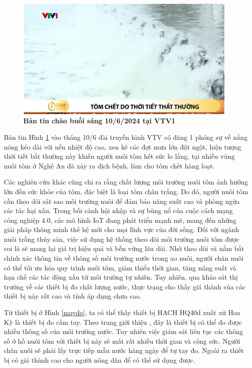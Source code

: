 \documentclass{article} %
\begin{document}
	\begin{figure}[!ht]
		\centering
		\includegraphics[width=11cm,height=6cm]{Images/Problem.png}
		\caption[Bản tin chào buối sáng 10/6/2024 tại VTV1\cite{VTVGo} ]{\bfseries \fontsize{12pt}{0pt}\selectfont Bản tin chào buối sáng 10/6/2024 tại VTV1\cite{VTVGo}}
		\label{Problem}
	\end{figure}
	
	Bản tin Hình \ref{Problem} vào tháng 10/6 đài truyền hình VTV có đăng 1 phóng sự \cite{VTVGo} về nắng nóng kéo dài với nền nhiệt độ cao, xen kẽ các đợt mưa lớn đột ngột, hiện tượng thời tiết bất thường này khiến người nuôi tôm hết sức lo lắng, tại nhiều vùng nuôi tôm ở Nghệ An đã xảy ra dịch bệnh, làm cho tôm chết hàng loạt.
	
	Các nghiên cứu khác cũng chỉ ra rằng chất lượng môi trường nuôi tôm ảnh hưởng lớn đến sức khỏe của tôm, đặc biệt là loại tôm chân trắng. Do đó, người nuôi tôm cần theo dõi sát sao môi trường nuôi để đảm bảo năng suất cao và phòng ngừa các tác hại xấu.
	Trong bối cảnh hội nhập và sự bùng nổ của cuộc cách mạng công nghiệp 4.0, các mô hình IoT đang phát triển mạnh mẽ, mang đến những giải pháp thông minh thế hệ mới cho mọi lĩnh vực của đời sống. Đối với ngành nuôi trồng thủy sản, việc sử dụng hệ thống theo dõi môi trường nuôi tôm được coi là sẽ mang lại giá trị hiệu quả và bền vững lâu dài. Nhờ theo dõi và nắm bắt chính xác thông tin về thông số môi trường nước trong ao nuôi, người chăn nuôi có thể tối ưu hóa quy trình nuôi tôm, giảm thiểu thời gian, tăng năng suất và hạn chế các tác động xấu từ môi trường tự nhiên.
	Tuy nhiên, qua khảo sát thị trường về các thiết bị đo chất lượng nước, thực trạng cho thấy giá thành của các thiết bị này rất cao và tính áp dụng chưa cao.
	
	Từ thiết bị ở Hình \ref{maydo}, ta có thể thấy thiết bị HACH HQ40d xuất xứ Hoa Kỳ là thiết bị đo cầm tay. Theo trang giới thiệu \cite{HannaHI9829}, đây là thiết bị có thể đo được nhiều thông số của môi trường nước. Tuy nhiên việc giám sát liên tục các thông số ở hồ nuôi tôm với thiết bị này sẽ mất rất nhiều thời gian và công sức. Người chăn nuôi sẽ phải lấy trực tiếp mẫu nước hàng ngày để tự tay đo. Ngoài ra thiết bị có giá thành cao cho người nông dân để có thể sử dụng được. 
	
\end{document}
